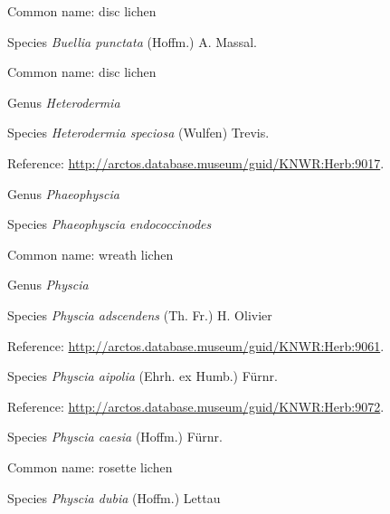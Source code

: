 \documentclass[9pt, article]{memoir}
\begin{document}
\begin{multicols}{2}
Common name: disc lichen

\vspace{6pt}\noindent\hspace{36pt}Species \textit{Buellia punctata} (Hoffm.) A. Massal.


Common name: disc lichen

\vspace{6pt}\noindent\hspace{30pt}Genus \textit{Heterodermia}


\vspace{6pt}\noindent\hspace{36pt}Species \textit{Heterodermia speciosa} (Wulfen) Trevis.


Reference: 
\url{http://arctos.database.museum/guid/KNWR:Herb:9017}.

\vspace{6pt}\noindent\hspace{30pt}Genus \textit{Phaeophyscia}


\vspace{6pt}\noindent\hspace{36pt}Species \textit{Phaeophyscia endococcinodes}


Common name: wreath lichen

\vspace{6pt}\noindent\hspace{30pt}Genus \textit{Physcia}


\vspace{6pt}\noindent\hspace{36pt}Species \textit{Physcia adscendens} (Th. Fr.) H. Olivier


Reference: 
\url{http://arctos.database.museum/guid/KNWR:Herb:9061}.

\vspace{6pt}\noindent\hspace{36pt}Species \textit{Physcia aipolia} (Ehrh. ex Humb.) Fürnr.


Reference: 
\url{http://arctos.database.museum/guid/KNWR:Herb:9072}.

\vspace{6pt}\noindent\hspace{36pt}Species \textit{Physcia caesia} (Hoffm.) Fürnr.


Common name: rosette lichen

\vspace{6pt}\noindent\hspace{36pt}Species \textit{Physcia dubia} (Hoffm.) Lettau



\end{multicols}
\end{document}
